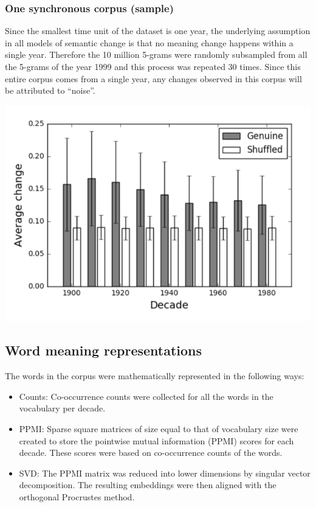 \documentclass[a0,landscape]{a0poster}
\begin{document}
\begin{multicols}{4}
\subsubsection*{ One synchronous corpus (sample)}
Since the smallest time unit of the dataset is one year, the underlying assumption in all models of semantic change is that no meaning change happens within a single year. Therefore the 10 million 5-grams were randomly subsampled from all the 5-grams of the year 1999 and this process was repeated 30 times. Since this entire corpus comes from a single year, any changes observed in this corpus will be attributed to “noise”.


\begin{center}\vspace{1cm}
  \includegraphics[width=0.8\linewidth]{image3.png}
\end{center}\vspace{1cm}

\subsection*{Word meaning representations} 
The words in the corpus were mathematically represented in the following ways:
\begin{itemize}
  \item Counts: Co-occurrence counts were collected for all the words in the vocabulary per decade.
  \item PPMI: Sparse square matrices of size equal to that of vocabulary size were created to store the pointwise mutual information (PPMI) scores for each decade. These scores were based on co-occurrence counts of the words.
  \item SVD: The PPMI matrix was reduced into lower dimensions by singular vector decomposition. The resulting embeddings were then aligned with the orthogonal Procrustes method.
\end{itemize}
 


\end{multicols}
\end{document}

